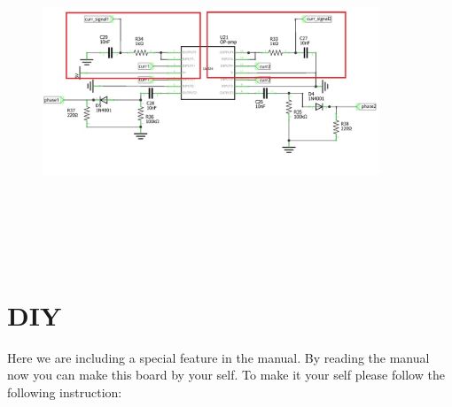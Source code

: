 \documentclass[a4paper,12pt,oneside]{book}
\begin{document}
\begin{appendices}
\begin{enumerate}
	\begin{figure}[h]
		\includegraphics[width=380px,height=380px]{bufferblock}
	\end{figure}
	  
\end{enumerate}
\section{DIY}
Here we are including a special feature in the manual. By reading the manual now you can make this board by your self. To make it your self please follow the following instruction:

\end{appendices}
\end{document}
